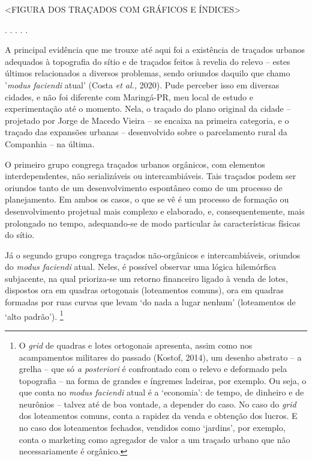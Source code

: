 \documentclass[]{report}
\begin{document}
	<FIGURA DOS TRAÇADOS COM GRÁFICOS E ÍNDICES>

	\begin{center}
		. . . . .
	\end{center}

	A principal evidência que me trouxe até aqui foi a existência de traçados urbanos adequados à topografia do sítio e de traçados feitos à revelia do relevo – estes últimos relacionados a diversos problemas, sendo oriundos daquilo que chamo '\textit{modus faciendi} atual' (Costa \textit{et al.,} 2020). Pude perceber isso em diversas cidades, e não foi diferente com Maringá-PR, meu local de estudo e experimentação até o momento. Nela, o traçado do plano original da cidade – projetado por Jorge de Macedo Vieira – se encaixa na primeira categoria, e o traçado das expansões urbanas – desenvolvido sobre o parcelamento rural da Companhia – na última. 

	O primeiro grupo congrega traçados urbanos orgânicos, com elementos interdependentes, não serializáveis ou intercambiáveis. Tais traçados podem ser oriundos tanto de um desenvolvimento espontâneo como de um processo de planejamento. Em ambos os casos, o que se vê é um processo de formação ou desenvolvimento projetual mais complexo e elaborado, e, consequentemente, mais prolongado no tempo, adequando-se de modo particular às características físicas do sítio. 

	Já o segundo grupo congrega traçados não-orgânicos e intercambiáveis, oriundos do \textit{modus faciendi} atual. Neles, é possível observar uma lógica hilemórfica subjacente, na qual prioriza-se um retorno financeiro ligado à venda de lotes, dispostos ora em quadras ortogonais (loteamentos comuns), ora em quadras formadas por ruas curvas que levam `do nada a lugar nenhum' (loteamentos de `alto padrão').%
		\footnote[4]{O \textit{grid} de quadras e lotes ortogonais apresenta, assim como nos acampamentos militares do passado (Kostof, 2014), um desenho abstrato – a grelha – que só \textit{a posteriori} é confrontado com o relevo e deformado pela topografia – na forma de grandes e íngremes ladeiras, por exemplo. Ou seja, o que conta no \textit{modus faciendi} atual é a `economia': de tempo, de dinheiro e de neurônios – talvez até de boa vontade, a depender do caso. No caso do \textit{grid} dos loteamentos comuns, conta a rapidez da venda e obtenção dos lucros. E no caso dos loteamentos fechados, vendidos como `jardins', por exemplo, conta o marketing como agregador de valor a um traçado urbano que não necessariamente é orgânico.}
\end{document}

